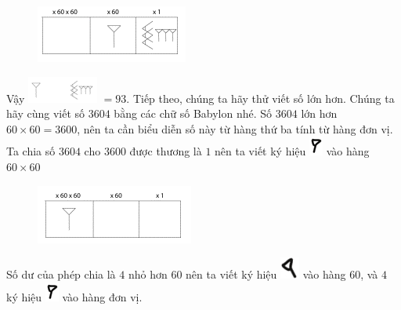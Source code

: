 \begin{multicols}{2}
	\begin{figure}[H]
		\centering
		\vspace*{-5pt}
		\captionsetup{labelformat= empty, justification=centering}
		\includegraphics[width=0.65\linewidth]{22}
		\vspace*{-10pt}
	\end{figure}
	Vậy \includegraphics[scale=0.85]{23}  $= 93$.
	\vskip 0.1cm
	Tiếp theo, chúng ta hãy thử viết số lớn hơn. Chúng ta hãy cùng viết số $3604$ bằng các chữ số Babylon nhé. Số $3604$ lớn hơn $60\times 60=3600$, nên ta cần biểu diễn số này từ hàng thứ ba tính từ hàng đơn vị. Ta chia số $3604$ cho $3600$ được thương là $1$ nên ta viết ký hiệu \includegraphics[scale=0.7]{15}  vào hàng $60\times60$
	\begin{figure}[H]
		\centering
		\vspace*{-5pt}
		\captionsetup{labelformat= empty, justification=centering}
		\includegraphics[width=0.65\linewidth]{25}
		\vspace*{-10pt}
	\end{figure}
	Số dư của phép chia là $4$ nhỏ hơn $60$ nên ta viết ký hiệu \includegraphics[scale=0.6]{15.1} vào hàng $60$, và $4$ ký hiệu \includegraphics[scale=0.7]{15} vào hàng đơn vị. 
	\begin{figure}[H]

\end{figure}
\end{multicols}
